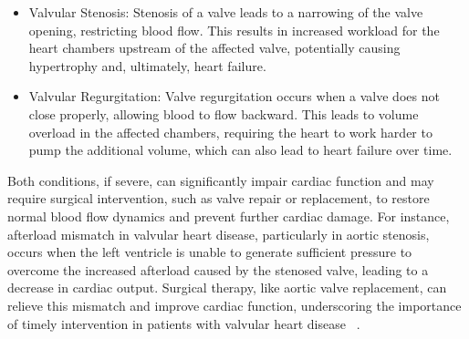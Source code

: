 \begin{itemize}
    \item Valvular Stenosis: Stenosis of a valve leads to a narrowing of the valve opening, restricting blood flow. This results in increased workload for the heart chambers upstream of the affected valve, potentially causing hypertrophy and, ultimately, heart failure.
    \item Valvular Regurgitation: Valve regurgitation occurs when a valve does not close properly, allowing blood to flow backward. This leads to volume overload in the affected chambers, requiring the heart to work harder to pump the additional volume, which can also lead to heart failure over time.
\end{itemize}
Both conditions, if severe, can significantly impair cardiac function and may require surgical intervention, such as valve repair or replacement, to restore normal blood flow dynamics and prevent further cardiac damage. For instance, afterload mismatch in valvular heart disease, particularly in aortic stenosis, occurs when the left ventricle is unable to generate sufficient pressure to overcome the increased afterload caused by the stenosed valve, leading to a decrease in cardiac output. Surgical therapy, like aortic valve replacement, can relieve this mismatch and improve cardiac function, underscoring the importance of timely intervention in patients with valvular heart disease ~.

